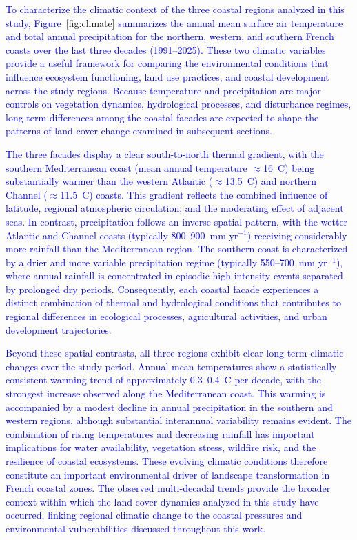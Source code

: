 \documentclass[coasts,article,submit,pdftex,moreauthors]{Definitions/mdpi}
\begin{document}
\textcolor{blue}{To characterize the climatic context of the three coastal regions analyzed in this study, Figure~\ref{fig:climate} summarizes the annual mean surface air temperature and total annual precipitation for the northern, western, and southern French coasts over the last three decades (1991--2025). These two climatic variables provide a useful framework for comparing the environmental conditions that influence ecosystem functioning, land use practices, and coastal development across the study regions. Because temperature and precipitation are major controls on vegetation dynamics, hydrological processes, and disturbance regimes, long-term differences among the coastal facades are expected to shape the patterns of land cover change examined in subsequent sections.}

\textcolor{blue}{The three facades display a clear south-to-north thermal gradient, with the southern Mediterranean coast (mean annual temperature $\approx$16~\degree C) being substantially warmer than the western Atlantic ($\approx$13.5~\degree C) and northern Channel ($\approx$11.5~\degree C) coasts. This gradient reflects the combined influence of latitude, regional atmospheric circulation, and the moderating effect of adjacent seas. In contrast, precipitation follows an inverse spatial pattern, with the wetter Atlantic and Channel coasts (typically 800--900~mm yr$^{-1}$) receiving considerably more rainfall than the Mediterranean region. The southern coast is characterized by a drier and more variable precipitation regime (typically 550--700~mm yr$^{-1}$), where annual rainfall is concentrated in episodic high-intensity events separated by prolonged dry periods. Consequently, each coastal facade experiences a distinct combination of thermal and hydrological conditions that contributes to regional differences in ecological processes, agricultural activities, and urban development trajectories.}

\textcolor{blue}{Beyond these spatial contrasts, all three regions exhibit clear long-term climatic changes over the study period. Annual mean temperatures show a statistically consistent warming trend of approximately 0.3--0.4~\degree C per decade, with the strongest increase observed along the Mediterranean coast. This warming is accompanied by a modest decline in annual precipitation in the southern and western regions, although substantial interannual variability remains evident. The combination of rising temperatures and decreasing rainfall has important implications for water availability, vegetation stress, wildfire risk, and the resilience of coastal ecosystems. These evolving climatic conditions therefore constitute an important environmental driver of landscape transformation in French coastal zones. The observed multi-decadal trends provide the broader context within which the land cover dynamics analyzed in this study have occurred, linking regional climatic change to the coastal pressures and environmental vulnerabilities discussed throughout this work.}
\end{document}
